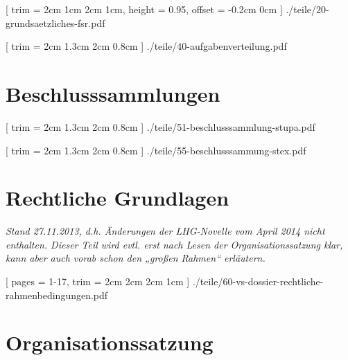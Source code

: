 \documentclass[
	8pt,
	a5paper,
	twoside
	]
	{book}
\begin{document}
\clearpage



	[
		trim = 2cm 1cm 2cm 1cm,
		height = 0.95\paperheight,
		offset = -0.2cm 0cm
	]
	{./teile/20-grundsaetzliches-fsr.pdf}





	[
		trim = 2cm 1.3cm 2cm 0.8cm
	]
	{./teile/40-aufgabenverteilung.pdf}


\chapter{Beschlusssammlungen}


\clearpage


%
%


	[
		trim = 2cm 1.3cm 2cm 0.8cm
	]
	{./teile/51-beschlusssammlung-stupa.pdf}


	[
		trim = 2cm 1.3cm 2cm 0.8cm
	]
	{./teile/55-beschlusssammung-stex.pdf}


\chapter{Rechtliche Grundlagen}

\textit{Stand 27.11.2013, d.h. Änderungen der LHG-Novelle vom April 2014 nicht enthalten. Dieser Teil wird evtl. erst nach Lesen der Organisationssatzung klar, kann aber auch vorab schon den „großen Rahmen“ erläutern.}

\clearpage


	[
		pages = 1-17,
		trim = 2cm 2cm 2cm 1cm
	]
	{./teile/60-vs-dossier-rechtliche-rahmenbedingungen.pdf}


\chapter{Organisationssatzung}
\end{document}
